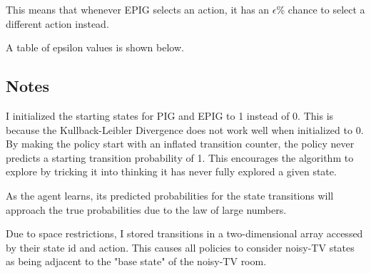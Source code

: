 \documentclass[12pt]{thesis}
\begin{document}
This means that whenever EPIG selects an action, it has an $\epsilon$\% chance to select a different action instead.

A table of epsilon values is shown below.
\subsection{Notes}
I initialized the starting states for PIG and EPIG to 1 instead of 0. This is because the Kullback-Leibler Divergence does not work well when initialized to 0. By making the policy start with an inflated transition counter, the policy never predicts a starting transition probability of 1. This encourages the algorithm to explore by tricking it into thinking it has never fully explored a given state.

As the agent learns, its predicted probabilities for the state transitions will approach the true probabilities due to the law of large numbers.

Due to space restrictions, I stored transitions in a two-dimensional array accessed by their state id and action. This causes all policies to consider noisy-TV states as being adjacent to the "base state" of the noisy-TV room.
\end{document}
